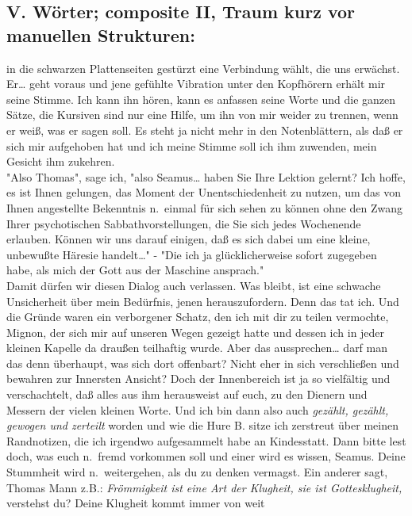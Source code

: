 \documentclass[
]{article}
\author{}
\date{\vspace{-2.5em}}
\begin{document}
\subsection{V. Wörter; composite II, Traum kurz vor manuellen
Strukturen:}\label{v.-wuxf6rter-composite-ii-traum-kurz-vor-manuellen-strukturen}

in die schwarzen Plattenseiten gestürzt eine Verbindung wählt, die uns
erwächst. Er\ldots{} geht voraus und jene gefühlte Vibration unter den
Kopfhörern erhält mir seine Stimme. Ich kann ihn hören, kann es anfassen
seine Worte und die ganzen Sätze, die Kursiven sind nur eine Hilfe, um
ihn von mir weider zu trennen, wenn er weiß, was er sagen soll. Es steht
ja nicht mehr in den Notenblättern, als daß er sich mir aufgehoben hat
und ich meine Stimme soll ich ihm zuwenden, mein Gesicht ihm zukehren.\\
"Also Thomas", sage ich, "also Seamus\ldots{} haben Sie Ihre Lektion
gelernt? Ich hoffe, es ist Ihnen gelungen, das Moment der
Unentschiedenheit zu nutzen, um das von Ihnen angestellte Bekenntnis
n.~einmal für sich sehen zu können ohne den Zwang Ihrer psychotischen
Sabbathvorstellungen, die Sie sich jedes Wochenende erlauben. Können wir
uns darauf einigen, daß es sich dabei um eine kleine, unbewußte Häresie
handelt\ldots" - "Die ich ja glücklicherweise sofort zugegeben habe, als
mich der Gott aus der Maschine ansprach."\\
Damit dürfen wir diesen Dialog auch verlassen. Was bleibt, ist eine
schwache Unsicherheit über mein Bedürfnis, jenen herauszufordern. Denn
das tat ich. Und die Gründe waren ein verborgener Schatz, den ich mit
dir zu teilen vermochte, Mignon, der sich mir auf unseren Wegen gezeigt
hatte und dessen ich in jeder kleinen Kapelle da draußen teilhaftig
wurde. Aber das aussprechen\ldots{} darf man das denn überhaupt, was
sich dort offenbart? Nicht eher in sich verschließen und bewahren zur
Innersten Ansicht? Doch der Innenbereich ist ja so vielfältig und
verschachtelt, daß alles aus ihm herausweist auf euch, zu den Dienern
und Messern der vielen kleinen Worte. Und ich bin dann also auch
\emph{gezählt, gezählt, gewogen und zerteilt} worden und wie die Hure B.
sitze ich zerstreut über meinen Randnotizen, die ich irgendwo
aufgesammelt habe an Kindesstatt. Dann bitte lest doch, was euch
n.~fremd vorkommen soll und einer wird es wissen, Seamus. Deine
Stummheit wird n.~weitergehen, als du zu denken vermagst. Ein anderer
sagt, Thomas Mann z.B.: \emph{Frömmigkeit ist eine Art der Klugheit, sie
ist Gottesklugheit, }verstehst du? Deine Klugheit kommt immer von weit
\end{document}
